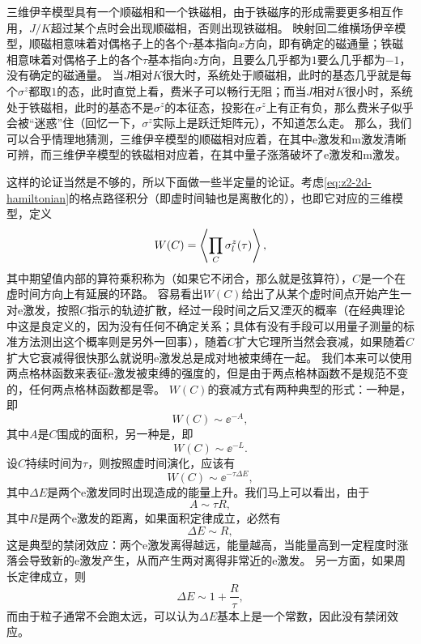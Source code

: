 三维伊辛模型具有一个顺磁相和一个铁磁相，由于铁磁序的形成需要更多相互作用，$J/K$超过某个点时会出现顺磁相，否则出现铁磁相。
映射回二维横场伊辛模型，顺磁相意味着对偶格子上的各个$\tau$基本指向$x$方向，即有确定的磁通量；铁磁相意味着对偶格子上的各个$\tau$基本指向$z$方向，且要么几乎都为$1$要么几乎都为$-1$，没有确定的磁通量。
当$J$相对$K$很大时，系统处于顺磁相，此时的基态几乎就是每个$\sigma^z$都取$1$的态，此时直觉上看，费米子可以畅行无阻；而当$J$相对$K$很小时，系统处于铁磁相，此时的基态不是$\sigma^z$的本征态，投影在$\sigma^z$上有正有负，那么费米子似乎会被“迷惑”住（回忆一下，$\sigma^z$实际上是跃迁矩阵元），不知道怎么走。
那么，我们可以合乎情理地猜测，三维伊辛模型的顺磁相对应着，在其中e激发和m激发清晰可辨，而三维伊辛模型的铁磁相对应着，在其中量子涨落破坏了e激发和m激发。

这样的论证当然是不够的，所以下面做一些半定量的论证。考虑\eqref{eq:z2-2d-hamiltonian}的格点路径积分（即虚时间轴也是离散化的），也即它对应的三维模型，定义
\begin{equation}
    W(C) = \expval{\prod_C \sigma^z_l(\tau)},
\end{equation}
其中期望值内部的算符乘积称为（如果它不闭合，那么就是弦算符），$C$是一个在虚时间方向上有延展的环路。
容易看出$W(C)$给出了从某个虚时间点开始产生一对e激发，按照$C$指示的轨迹扩散，经过一段时间之后又湮灭的概率（在经典理论中这是良定义的，因为没有任何不确定关系；具体有没有手段可以用量子测量的标准方法测出这个概率则是另外一回事），随着$C$扩大它理所当然会衰减，如果随着$C$扩大它衰减得很快那么就说明e激发总是成对地被束缚在一起。
我们本来可以使用两点格林函数来表征e激发被束缚的强度的，但是由于两点格林函数不是规范不变的，任何两点格林函数都是零。
$W(C)$的衰减方式有两种典型的形式：一种是，即
\begin{equation}
    W(C) \sim \ee^{-A},
\end{equation}
其中$A$是$C$围成的面积，另一种是，即
\begin{equation}
    W(C) \sim \ee^{-L}.
\end{equation}
设$C$持续时间为$\tau$，则按照虚时间演化，应该有
\[
    W(C) \sim \ee^{-\tau \Delta E},
\]
其中$\Delta E$是两个e激发同时出现造成的能量上升。我们马上可以看出，由于
\[
    A \sim \tau R,
\]
其中$R$是两个e激发的距离，如果面积定律成立，必然有
\[
    \Delta E \sim R,
\]
这是典型的禁闭效应：两个e激发离得越远，能量越高，当能量高到一定程度时涨落会导致新的e激发产生，从而产生两对离得非常近的e激发。
另一方面，如果周长定律成立，则
\[
    \Delta E \sim 1 + \frac{R}{\tau},
\]
而由于粒子通常不会跑太远，可以认为$\Delta E$基本上是一个常数，因此没有禁闭效应。

